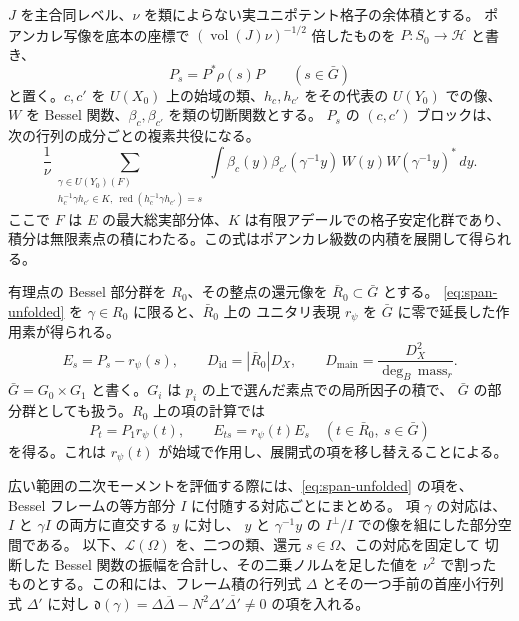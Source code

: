 \(J\) を主合同レベル、\(\nu\) を類によらない実ユニポテント格子の余体積とする。
ポアンカレ写像を底本の座標で \((\operatorname{vol}(J)\nu)^{-1/2}\) 倍したものを
\(P\colon S_0\to\mathcal H\) と書き、
\[
 P_s=P^*\rho(s)P \qquad(s\in\bar G)
\]
と置く。\(c,c'\) を \(U(X_0)\) 上の始域の類、\(h_c,h_{c'}\) をその代表の \(U(Y_0)\) での像、
\(W\) を Bessel 関数、\(\beta_c,\beta_{c'}\) を類の切断関数とする。
\(P_s\) の \((c,c')\) ブロックは、次の行列の成分ごとの複素共役になる。
\begin{equation}\label{eq:span-unfolded}
 \frac1\nu
 \sum_{\substack{\gamma\in U(Y_0)(F)\\
       h_c^{-1}\gamma h_{c'}\in K,\
       \operatorname{red}(h_c^{-1}\gamma h_{c'})=s}}
 \int
    \beta_c(y)\beta_{c'}(\gamma^{-1}y)\,
    W(y)W(\gamma^{-1}y)^*\,dy .
\end{equation}
ここで \(F\) は \(E\) の最大総実部分体、\(K\) は有限アデールでの格子安定化群であり、
積分は無限素点の積にわたる。この式はポアンカレ級数の内積を展開して得られる。

有理点の Bessel 部分群を \(R_0\)、その整点の還元像を \(\bar R_0\subset\bar G\) とする。
\eqref{eq:span-unfolded} を \(\gamma\in R_0\) に限ると、\(\bar R_0\) 上の
ユニタリ表現 \(r_\psi\) を \(\bar G\) に零で延長した作用素が得られる。
\[
  E_s=P_s-r_\psi(s),\qquad
  D_{\mathrm{id}}=|\bar R_0|D_X,\qquad
  D_{\mathrm{main}}=\frac{D_X^2}{\deg_B\,\mathrm{mass}_r}.
\]
\(\bar G=G_0\times G_1\) と書く。\(G_i\) は \(p_i\) の上で選んだ素点での局所因子の積で、
\(\bar G\) の部分群としても扱う。\(R_0\) 上の項の計算では
\begin{equation}\label{eq:span-equivariance}
 P_t=P_1r_\psi(t),\qquad E_{ts}=r_\psi(t)E_s
 \quad(t\in\bar R_0,\ s\in\bar G)
\end{equation}
を得る。これは \(r_\psi(t)\) が始域で作用し、展開式の項を移し替えることによる。

広い範囲の二次モーメントを評価する際には、\eqref{eq:span-unfolded} の項を、
Bessel フレームの等方部分 \(I\) に付随する対応ごとにまとめる。
項 \(\gamma\) の対応は、\(I\) と \(\gamma I\) の両方に直交する \(y\) に対し、
\(y\) と \(\gamma^{-1}y\) の \(I^\perp/I\) での像を組にした部分空間である。
以下、\(\mathcal L(\Omega)\) を、二つの類、還元 \(s\in\Omega\)、この対応を固定して
切断した Bessel 関数の振幅を合計し、その二乗ノルムを足した値を \(\nu^2\) で割った
ものとする。この和には、フレーム積の行列式 \(\Delta\) とその一つ手前の首座小行列式
\(\Delta'\) に対し
\(\mathfrak d(\gamma)
   =\Delta\overline{\Delta}-N^2\Delta'\overline{\Delta'}\ne0\)
の項を入れる。

